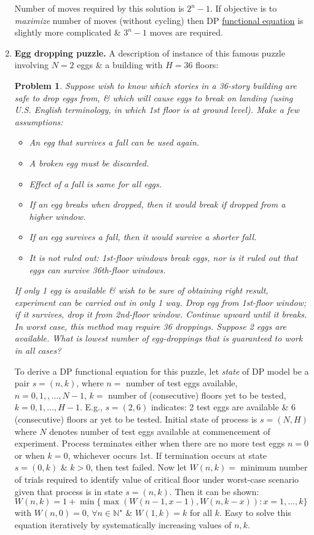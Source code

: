 \documentclass{article}
\newtheorem{problem}{Problem}
\begin{document}
\begin{enumerate}
	Number of moves required by this solution is $2^n - 1$. If objective is to {\it maximize} number of moves (without cycling) then DP \href{https://en.wikipedia.org/wiki/Bellman_equation}{functional equation} is slightly more complicated \& $3^n - 1$ moves are required.
	\item {\bf Egg dropping puzzle.} A description of instance of this famous puzzle involving $N = 2$ eggs \& a building with $H = 36$ floors:
	\begin{problem}
		Suppose wish to know which stories in a 36-story building are safe to drop eggs from, \& which will cause eggs to break on landing (using U.S. English terminology, in which 1st floor is at ground level). Make a few assumptions:
		\begin{itemize}
			\item An egg that survives a fall can be used again.
			\item A broken egg must be discarded.
			\item Effect of a fall is same for all eggs.
			\item If an egg breaks when dropped, then it would break if dropped from a higher window.
			\item If an egg survives a fall, then it would survive a shorter fall.
			\item It is not ruled out: 1st-floor windows break eggs, nor is it ruled out that eggs can survive 36th-floor windows.
		\end{itemize}
		If only 1 egg is available \& wish to be sure of obtaining right result, experiment can be carried out in only 1 way. Drop egg from 1st-floor window; if it survives, drop it from 2nd-floor window. Continue upward until it breaks. In worst case, this method may require 36 droppings. Suppose 2 eggs are available. What is lowest number of egg-droppings that is guaranteed to work in all cases?
	\end{problem}
	To derive a DP functional equation for this puzzle, let {\it state} of DP model be a pair $s = (n,k)$, where $n =$ number of test eggs available, $n = 0,1,,\ldots,N - 1$, $k =$ number of (consecutive) floors yet to be tested, $k = 0,1,\ldots,H - 1$. E.g., $s = (2,6)$ indicates: 2 test eggs are available \& 6 (consecutive) floors ar yet to be tested. Initial state of process is $s = (N,H)$ where $N$ denotes number of test eggs available at commencement of experiment. Process terminates either when there are no more test eggs $n = 0$ or when $k = 0$, whichever occurs 1st. If termination occurs at state $s = (0,k)$ \& $k > 0$, then test failed. Now let $W(n,k) =$  minimum number of trials required to identify value of critical floor under worst-case scenario given that process is in state $s = (n,k)$. Then it can be shown: $W(n,k) = 1 + \min\{\max(W(n - 1,x - 1), W(n,k - x)):x = 1,\ldots,k\}$ with $W(n,0) = 0$, $\forall n\in\mathbb{N}^\star$ \& $W(1,k) = k$ for all $k$. Easy to solve this equation iteratively by systematically increasing values of $n,k$.

\end{enumerate}
\end{document}
